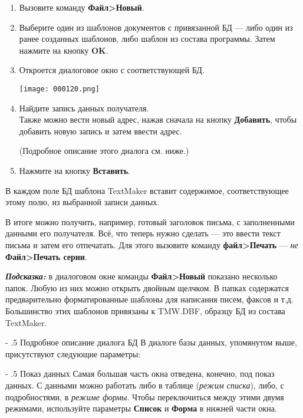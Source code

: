 ﻿\documentclass[a4paper,10pt]{article}
\makeatletter
\renewcommand\paragraph{%
   \@startsection{paragraph}{4}{0mm}%
      {-\baselineskip}%
      {.5\baselineskip}%
      {\normalfont\normalsize\bfseries}}
\makeatother
\begin{document}
\begin{enumerate}
 \item Вызовите команду \textbf{Файл>Новый}.
 \item Выберите один из шаблонов документов с привязанной БД — либо один из ранее созданных шаблонов, либо шаблон из состава программы. Затем нажмите на кнопку \textbf{OK}.
 \item Откроется диалоговое окно с соответствующей БД.
 
 \texttt{[image: 000120.png]}
 
 \item Найдите запись данных получателя.\\
 Также можно вести новый адрес, нажав сначала на кнопку \textbf{Добавить}, чтобы добавить новую запись и затем ввести адрес.
 
 (Подробное описание этого диалога см. ниже.)
 \item Нажмите на кнопку \textbf{Вставить}.
 \end{enumerate}
 
 В каждом поле БД шаблона TextMaker вставит содержимое, соответствующее этому полю, из выбранной записи данных.
 
 В итоге можно получить, например, готовый заголовок письма, с заполненными данными его получателя. Всё, что теперь нужно сделать — это ввести текст письма и затем его отпечатать. Для этого вызовите команду \textbf{файл>Печать} — \textit{не} \textbf{Файл>Печать серии}.
 
 \begin{mdframed}[backgroundcolor=blue!10]
\textbf{\textit{Подсказка:}} в диалоговом окне команды \textbf{Файл>Новый} показано несколько папок. Любую из них можно открыть двойным щелчком. В папках содержатся предварительно форматированные шаблоны для написания писем, факсов и т.д. Большинство этих шаблонов привязаны к TMW.DBF, образцу БД из состава TextMaker.
\end{mdframed}

\paragraph{Подробное описание диалога БД}
В диалоге базы данных, упомянутом выше, присутствуют следующие параметры:

\paragraph{Показ данных}
Самая большая часть окна отведена, конечно, под показ данных. С данными можно работать либо в таблице (\textit{режим списка}), либо, с подробностями, в \textit{режиме формы}. Чтобы переключиться между этими двумя режимами, используйте параметры \textbf{Список} и \textbf{Форма} в нижней части окна.
\end{document}
